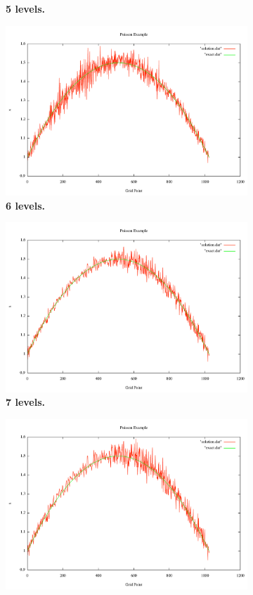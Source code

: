\documentclass[note]{TechNote}
\begin{document}
\begin{figure}[h!]
\begin{subfigure}[b]{0.3\textwidth}
    \caption{\textbf{5 levels.}}
  \end{subfigure}
  \begin{subfigure}[b]{0.3\textwidth}
    \includegraphics[width=\textwidth]{7_sec_6_level.pdf}
    \caption{\textbf{6 levels.}}
  \end{subfigure}
  \begin{subfigure}[b]{0.3\textwidth}
    \includegraphics[width=\textwidth]{7_sec_7_level.pdf}
    \caption{\textbf{7 levels.}}
  \end{subfigure}
  \begin{subfigure}[b]{0.3\textwidth}
    \includegraphics[width=\textwidth]{7_sec_8_level.pdf}

\end{subfigure}
\end{figure}
\end{document}
